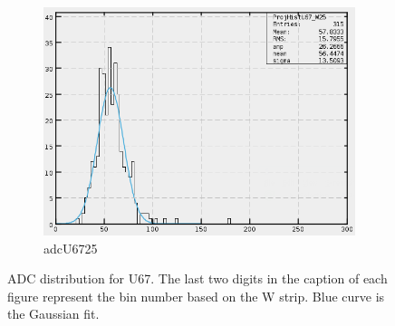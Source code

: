 \begin{figure}[h]
\begin{subfigure}[h]{0.3\textwidth}
        \includegraphics[width=\textwidth, keepaspectratio = true]{adcU67_25}
        \caption{adcU6725}
        \label{fig:adcU67_25}
    \end{subfigure}
    \caption{ADC distribution for U67. The last two digits in the caption of each figure represent the bin number based on the W strip.
    Blue curve is the Gaussian fit.}
    \label{fig:adcU2}
\end{figure}

